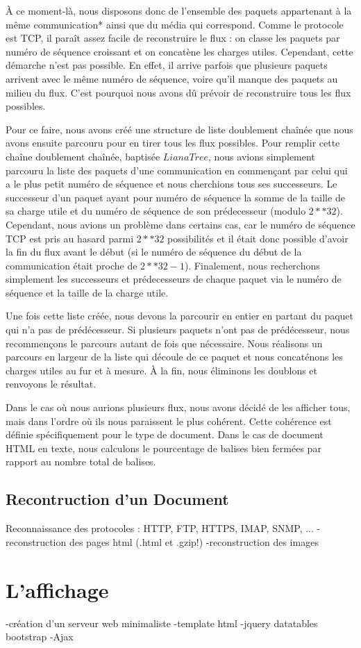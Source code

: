 \indent À ce moment-là, nous disposons donc de l'ensemble des paquets appartenant à la même communication* ainsi que du média qui correspond. Comme le protocole est TCP,
il paraît assez facile de reconstruire le flux : on classe les paquets par numéro de séquence croissant et on concatène les charges utiles. Cependant, cette démarche 
n'est pas possible. En effet, il arrive parfois que plusieurs paquets arrivent avec le même numéro de séquence, voire qu'il manque des paquets au milieu du flux.
C'est pourquoi nous avons dû prévoir de reconstruire tous les flux possibles.


\indent Pour ce faire, nous avons créé une structure de liste doublement chaînée que nous avons ensuite parcouru pour en tirer tous les flux possibles. Pour remplir cette chaîne
doublement chaînée, baptisée $LianaTree$, nous avions simplement parcouru la liste des paquets d'une communication en commençant par celui qui a le plus petit numéro de séquence et 
nous cherchions tous ses successeurs. Le successeur d'un paquet ayant pour numéro de séquence la somme de la taille de sa charge utile et du numéro de séquence de son prédecesseur 
(modulo $2**32$).
Cependant, nous avions un problème dans certains cas, car le numéro de séquence TCP est pris au hasard parmi $2**32$ possibilités et il était donc possible d'avoir la fin du flux 
avant le début (si le numéro de séquence du début de la communication était proche de $2**32 -1$). Finalement, nous recherchons simplement les successeurs et prédecesseurs de chaque
paquet via le numéro de séquence et la taille de la charge utile.

Une fois cette liste créée, nous devons la parcourir en entier en partant du paquet qui n'a pas de prédécesseur. Si plusieurs paquets n'ont pas de prédécesseur, nous recommençons le parcours autant de fois que nécessaire. Nous réalisons un parcours en largeur de la liste qui découle de ce paquet et nous concaténons les charges utiles au fur et à mesure. À la fin, nous éliminons
 les doublons et renvoyons le résultat.



Dans le cas où nous aurions plusieurs flux, nous avons décidé de les afficher tous, mais dans l'ordre où ils nous paraissent le plus cohérent. Cette cohérence est définie spécifiquement 
pour le type de document. Dans le cas de document HTML en texte, nous calculons le pourcentage de balises bien fermées par rapport au nombre total de balises.

\subsection{Recontruction d'un Document}
Reconnaissance des protocoles : HTTP, FTP, HTTPS, IMAP, SNMP, ...
-reconstruction des pages html (.html et .gzip!)
-reconstruction des images

\section{L'affichage}
-création d'un serveur web minimaliste
-template html
-jquery datatables bootstrap
-Ajax

